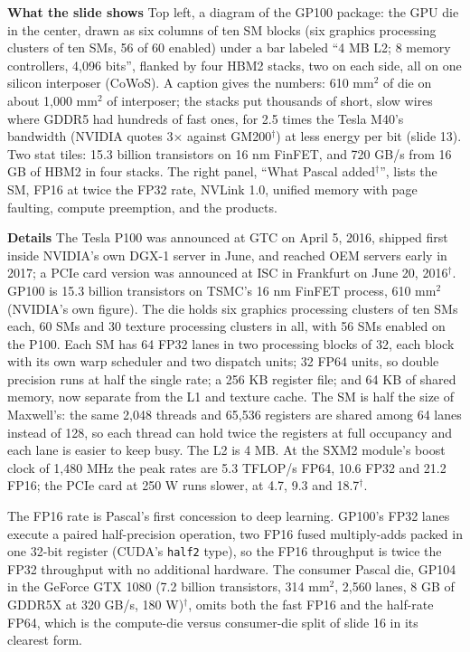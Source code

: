 \documentclass[11pt,letterpaper]{article}
\newcommand{\para}[1]{\medskip\noindent\textbf{#1}\quad}
\begin{document}
\para{What the slide shows} Top left, a diagram of the GP100 package: the GPU die in the center, drawn as six columns of ten SM blocks (six graphics processing clusters of ten SMs, 56 of 60 enabled) under a bar labeled ``4 MB L2; 8 memory controllers, 4,096 bits'', flanked by four HBM2 stacks, two on each side, all on one silicon interposer (CoWoS). A caption gives the numbers: 610 mm$^2$ of die on about 1,000 mm$^2$ of interposer; the stacks put thousands of short, slow wires where GDDR5 had hundreds of fast ones, for 2.5 times the Tesla M40's bandwidth (NVIDIA quotes 3$\times$ against GM200$^\dagger$) at less energy per bit (slide 13). Two stat tiles: 15.3 billion transistors on 16 nm FinFET, and 720 GB/s from 16 GB of HBM2 in four stacks. The right panel, ``What Pascal added$^\dagger$'', lists the SM, FP16 at twice the FP32 rate, NVLink 1.0, unified memory with page faulting, compute preemption, and the products.

\para{Details} The Tesla P100 was announced at GTC on April 5, 2016, shipped first inside NVIDIA's own DGX-1 server in June, and reached OEM servers early in 2017; a PCIe card version was announced at ISC in Frankfurt on June 20, 2016$^\dagger$. GP100 is 15.3 billion transistors on TSMC's 16 nm FinFET process, 610 mm$^2$ (NVIDIA's own figure). The die holds six graphics processing clusters of ten SMs each, 60 SMs and 30 texture processing clusters in all, with 56 SMs enabled on the P100. Each SM has 64 FP32 lanes in two processing blocks of 32, each block with its own warp scheduler and two dispatch units; 32 FP64 units, so double precision runs at half the single rate; a 256 KB register file; and 64 KB of shared memory, now separate from the L1 and texture cache. The SM is half the size of Maxwell's: the same 2,048 threads and 65,536 registers are shared among 64 lanes instead of 128, so each thread can hold twice the registers at full occupancy and each lane is easier to keep busy. The L2 is 4 MB. At the SXM2 module's boost clock of 1,480 MHz the peak rates are 5.3 TFLOP/s FP64, 10.6 FP32 and 21.2 FP16; the PCIe card at 250 W runs slower, at 4.7, 9.3 and 18.7$^\dagger$.

The FP16 rate is Pascal's first concession to deep learning. GP100's FP32 lanes execute a paired half-precision operation, two FP16 fused multiply-adds packed in one 32-bit register (CUDA's \texttt{half2} type), so the FP16 throughput is twice the FP32 throughput with no additional hardware. The consumer Pascal die, GP104 in the GeForce GTX 1080 (7.2 billion transistors, 314 mm$^2$, 2,560 lanes, 8 GB of GDDR5X at 320 GB/s, 180 W)$^\dagger$, omits both the fast FP16 and the half-rate FP64, which is the compute-die versus consumer-die split of slide 16 in its clearest form.
\end{document}
